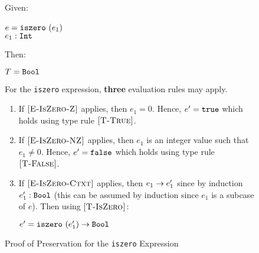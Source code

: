 \documentclass{report}
\newcommand{\rel}[1]{\mbox{\sc [#1]}}
\begin{document}
\begin{figure}[ht!]
Given:
\begin{center}
   $e = \mbox{\tt iszero}~(e_1)$~\\
   ${e_1} : {\mbox{\tt Int}}$
\end{center}
Then:
\begin{center}
   $T = \mbox{\tt Bool}$
\end{center}
For the \texttt{iszero} expression, \textbf{three} evaluation rules may apply.
\begin{enumerate}

    \item If $\rel{E-IsZero-Z}$ applies, then $e_1 = 0$.  Hence, $e' = \mbox{\tt true}$ which holds using type rule $\rel{T-True}$.
      
    \item If $\rel{E-IsZero-NZ}$ applies, then $e_1$ is an integer value such that $e_1 \ne 0$.  Hence, $e' = \mbox{\tt false}$ which holds using type rule $\rel{T-False}$.
    
    \item If $\rel{E-IsZero-Ctxt}$ applies, then ${e_1} \rightarrow {e'_1}$ since by induction ${e'_1} : {\mbox{\tt Bool}}$ (this can be assumed by induction since $e_1$ is a subcase of $e$).  Then using $\rel{T-IsZero}$:
    
    \begin{center}
      ${e' = \mbox{\tt iszero}~(e'_1)} \rightarrow {\mbox{\tt Bool}}$
    \end{center}
    
\end{enumerate}

  \caption{Proof of Preservation for the \texttt{iszero} Expression}\label{fig:isZeroProofPreservation}
\end{figure} 
\end{document}
